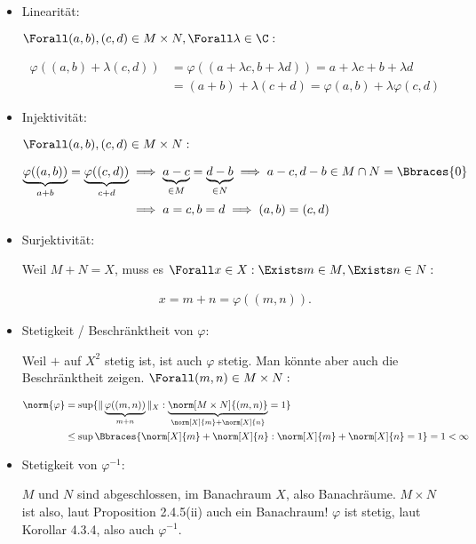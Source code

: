 \begin{solution}

\phantom{}

\begin{itemize}

  \item
  Linearität:

  $\Forall (a, b), (c, d) \in M \times N, \Forall \lambda \in \C:$

  \begin{align*}
    \varphi((a,b) + \lambda (c,d))
    & =
    \varphi ((a + \lambda c, b + \lambda d))
    =
    a + \lambda c + b + \lambda d \\
    & =
    (a + b) + \lambda (c + d)
    =
    \varphi (a, b) + \lambda \varphi (c, d)
  \end{align*}

  \item
  Injektivität:

  $\Forall (a, b), (c, d) \in M \times N:$

  \begin{align*}
    \underbrace{\varphi((a, b))}_{a + b}
    =
    \underbrace{\varphi((c, d))}_{c + d}
    & \implies
    \underbrace{a - c}_{\in M}
    =
    \underbrace{d - b}_{\in N}
    \implies
    a - c, d - b \in M \cap N = \Bbraces{0} \\
    & \implies
    a = c, b = d
    \implies
    (a, b) = (c, d)
  \end{align*}

  \item
  Surjektivität:

  Weil $M + N = X$, muss es $\Forall x \in X: \Exists m \in M, \Exists n \in N:$

  \begin{align*}
    x = m + n = \varphi((m, n)).
  \end{align*}

  \item
  Stetigkeit / Beschränktheit von $\varphi$:

  Weil $+$ auf $X^2$ stetig ist, ist auch $\varphi$ stetig.
  Man könnte aber auch die Beschränktheit zeigen.
  $\Forall (m, n) \in M \times N:$

  \begin{align*}
    \norm{\varphi}
    & =
    \sup \{
      \| \underbrace{\varphi((m, n))}_{m + n} \|_X:
      \underbrace
      {
        \norm[M \times N]{(m, n)}
      }_{
        \norm[X]{m} + \norm[X]{n}
      } = 1
    \} \\
    & \leq
    \sup \Bbraces{
      \norm[X]{m} + \norm[X]{n}:
      \norm[X]{m} + \norm[X]{n} = 1
    }
    = 1 < \infty
  \end{align*}

  \item
  Stetigkeit von $\varphi^{-1}$:

  $M$ und $N$ sind abgeschlossen, im Banachraum $X$, also Banachräume.
  $M \times N$ ist also, laut Proposition 2.4.5(ii) auch ein Banachraum!
  $\varphi$ ist stetig, laut Korollar 4.3.4, also auch $\varphi^{-1}$.

 \end{itemize}

\end{solution}
